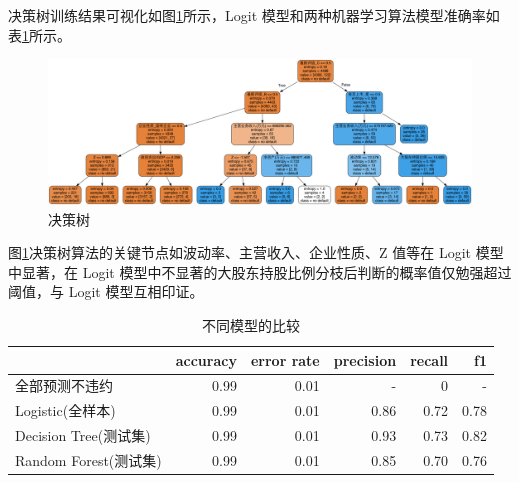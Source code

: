 决策树训练结果可视化如图\ref{fig:decision_tree}所示，Logit 模型和两种机器学习算法模型准确率如表\ref{tab:acc}所示。

\begin{figure}[h]
	\centering
	\includegraphics[width=.9\linewidth]{./data/decision_tree.png}
	\caption{\label{fig:decision_tree}决策树}
\end{figure}

图\ref{fig:decision_tree}决策树算法的关键节点如波动率、主营收入、企业性质、Z 值等在 Logit 模型中显著，在 Logit 模型中不显著的大股东持股比例分枝后判断的概率值仅勉强超过阈值，与 Logit 模型互相印证。

\begin{table}
	\caption{\label{tab:acc}不同模型的比较}
	\centering
	\begin{tabular}{lrrrrr}
		                      & accuracy & error rate & precision & recall & f1   \\
		\hline
		全部预测不违约        & 0.99     & 0.01       & -         & 0      & -    \\
		Logistic(全样本)      & 0.99     & 0.01       & 0.86      & 0.72   & 0.78 \\
		Decision Tree(测试集) & 0.99     & 0.01       & 0.93      & 0.73   & 0.82 \\
		Random Forest(测试集) & 0.99     & 0.01       & 0.85      & 0.70   & 0.76 \\
	\end{tabular}
\end{table}

